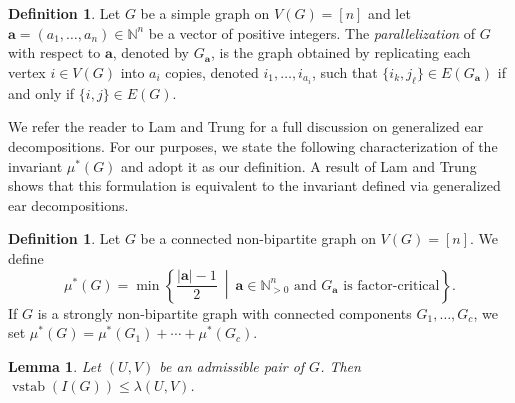 \documentclass[12pt,reqno,twoside]{amsart}
\newtheorem{lem}[thm]{\bf Lemma}
\theoremstyle{definition}
\newtheorem{defn}[thm]{\bf Definition}
\theoremstyle{plain}
\theoremstyle{remark}
\numberwithin{equation}{section}
\begin{document}
\begin{defn}
Let $G$ be a simple graph on $V(G) = [n]$ and let $\mathbf{a} = (a_1, \ldots, a_n) \in \mathbb{N}^n$ be a vector of positive integers. The \emph{parallelization} of $G$ with respect to $\mathbf{a}$, denoted by $G_{\mathbf{a}}$, is the graph obtained by replicating each vertex $i \in V(G)$ into $a_i$ copies, denoted $i_1, \ldots, i_{a_i}$, such that $\{i_k, j_\ell\} \in E(G_{\mathbf{a}})$ if and only if $\{i,j\} \in E(G)$.
\end{defn}

We refer the reader to Lam and Trung \cite{LT} for a full discussion on generalized ear decompositions. For our purposes, we state the following characterization of the invariant $\mu^*(G)$ and adopt it as our definition. A result of Lam and Trung \cite{LT} shows that this formulation is equivalent to the invariant defined via generalized ear decompositions.

\begin{defn} 
Let $G$ be a connected non-bipartite graph on $V(G) = [n]$. We define
\[
\mu^*(G) = \min \left\{ \frac{|\mathbf{a}| - 1}{2} \ \middle|\ \mathbf{a} \in \mathbb{N}_{>0}^n \text{ and } G_{\mathbf{a}} \text{ is factor-critical} \right\}.
\]
If $G$ is a strongly non-bipartite graph with connected components $G_1, \ldots, G_c$, we set $\mu^*(G) = \mu^*(G_1) + \cdots + \mu^*(G_c)$.
\end{defn}

\begin{lem}\label{lem_admissible} 
Let $(U,V)$ be an admissible pair of $G$. Then $\operatorname{vstab}(I(G)) \le \lambda(U,V)$. 
\end{lem}
\end{document}
